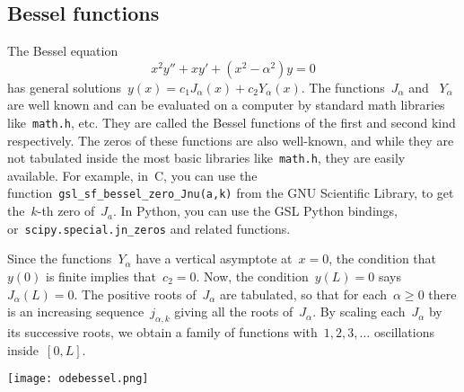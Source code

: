\subsection{Bessel functions}

The Bessel equation
\begin{equation}\label{eq:bessel}
	x^2y''+xy'+(x^2-\alpha^2)y = 0
\end{equation}
has general solutions~$y(x)=c_1 J_{\alpha}(x)+c_2 Y_{\alpha}(x)$.
The functions~$J_\alpha$ and ~$Y_\alpha$ are well known and can be
evaluated on a computer by standard math libraries
like~\verb+math.h+, etc.
They are called the Bessel functions of the first and second kind
respectively.  The zeros of these functions are also well-known, and
while they are not tabulated inside the most basic libraries
like~\verb+math.h+, they are easily available.  For example,
in~C, you can use the function~\verb+gsl_sf_bessel_zero_Jnu(a,k)+ from the
GNU Scientific Library, to get the~$k$-th zero of~$J_a$.  In Python,
you can use the GSL Python bindings, or~\verb+scipy.special.jn_zeros+
and related functions.

Since the functions~$Y_\alpha$ have a vertical asymptote at~$x=0$,
the condition that~$y(0)$ is finite implies that~$c_2=0$.  Now, the
condition~$y(L)=0$ says~$J_\alpha(L)=0$.  The positive roots of~$J_\alpha$ are
tabulated, so that for each~$\alpha\ge 0$ there is an increasing
sequence~$j_{\alpha,k}$ giving all the roots of~$J_\alpha$.
By scaling each~$J_\alpha$ by its successive roots, we obtain a
family of functions with~$1,2,3,\ldots$ oscillations inside~$[0,L]$.

\texttt{[image: odebessel.png]}

